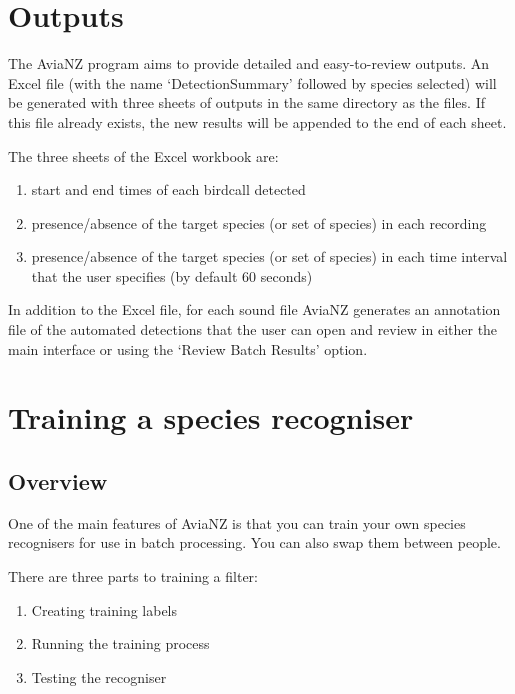 \documentclass{article}
\begin{document}
\section{Outputs}
\label{sec:outputs}

The AviaNZ program aims to provide detailed and easy-to-review outputs. An Excel file (with the name `DetectionSummary' followed by species selected) will be generated with three sheets of outputs in the same directory as the files. If this file already exists, the new results will be appended to the end of each sheet. 

The three sheets of the Excel workbook are:
\begin{enumerate}
\item start and end times of each birdcall detected
\item presence/absence of the target species (or set of species) in each recording
\item  presence/absence of the target species (or set of species) in each time interval that the user specifies (by default 60 seconds)
\end{enumerate}

In addition to the Excel file, for each sound file AviaNZ generates an annotation file of the automated detections that  the user can open and review in either the main interface or using the `Review Batch Results' option. 

\newpage
\section{Training a species recogniser}\label{sec:trainfilter}

\subsection{Overview}

One of the main features of AviaNZ is that you can train your own species recognisers for use in batch processing. You can also swap them between people.%

There are three parts to training a filter:

\begin{enumerate}
\item Creating training labels
\item Running the training process
\item Testing the recogniser
\end{enumerate}
\end{document}

